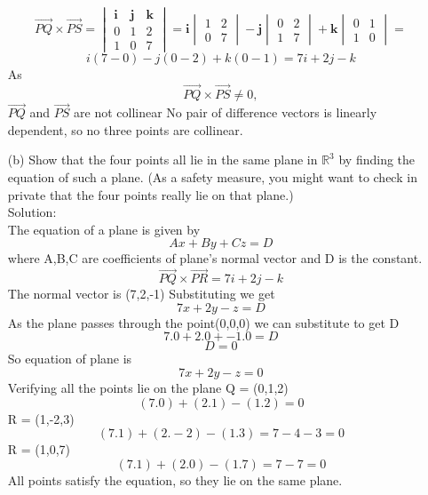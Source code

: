 \begin{enumerate}
    \[
\vec{PQ} \times \vec{PS} =
\begin{vmatrix}
\mathbf{i} & \mathbf{j} & \mathbf{k} \\
0 & 1 & 2 \\
1 & 0 & 7
\end{vmatrix}
= \mathbf{i} \begin{vmatrix} 1 & 2 \\ 0 & 7 \end{vmatrix}
- \mathbf{j} \begin{vmatrix} 0 & 2 \\ 1 & 7 \end{vmatrix}
+ \mathbf{k} \begin{vmatrix} 0 & 1 \\ 1 & 0 \end{vmatrix} =
\]
\[
i(7-0)-j(0-2)+k(0-1) = 7i+2j-k
\]
As
\[
\vec{PQ} \times \vec{PS} \neq 0, 
\]
$\vec{PQ}$ and $\vec{PS}$ are not collinear
    No pair of difference vectors is linearly dependent, so no three points are collinear.
    \item[(b)] Show that the four points all lie in the same plane in $\mathbb{R}^3$ by finding the equation of such a plane.
(As a safety measure, you might want to check in private that the four points really lie on that
plane.)\\
Solution: \\

The equation of a plane is given by 
\[
Ax+By+Cz=D
\]
where A,B,C are coefficients of plane's normal vector and D is the constant.
\[
\vec{PQ} \times \vec{PR} = 7i+2j-k
\]
The normal vector is (7,2,-1)
Substituting we get 
\[
7x+2y-z = D
\]
As the plane passes through the point(0,0,0) we can substitute to get D
\[
7.0 + 2.0 + -1.0 = D 
\]
\[
D = 0
\]
So equation of plane is 
\[
7x+2y-z=0
\]
Verifying all the points lie on the plane
Q = (0,1,2)
\[
(7.0)+(2.1)-(1.2)= 0
\]
R = (1,-2,3)
\[
(7.1)+(2.-2)-(1.3)= 7-4-3 = 0
\]
R = (1,0,7)
\[
(7.1)+(2.0)-(1.7)= 7-7 = 0
\]
All points satisfy the equation, so they lie on the same plane.

\end{enumerate}